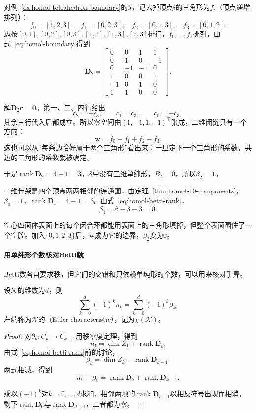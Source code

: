 \begin{example}[四面体表面的同调]
\label{ex:homol-tetrahedron-homology}
对例~\ref{ex:homol-tetrahedron-boundary}的$\mathcal S$，记去掉顶点$i$的三角形为$f_i$（顶点递增排列）：
\[
 f_0=[1,2,3],\quad f_1=[0,2,3],\quad f_2=[0,1,3],\quad f_3=[0,1,2].
\]
边按$[0,1],[0,2],[0,3],[1,2],[1,3],[2,3]$排行，$f_0,\ldots,f_3$排列，由式~\eqref{eq:homol-boundary}得到
\[
 \bm D_2=\begin{bmatrix}
 0&0&1&1\\
 0&1&0&-1\\
 0&-1&-1&0\\
 1&0&0&1\\
 -1&0&1&0\\
 1&1&0&0
 \end{bmatrix}.
\]

解$\bm D_2\bm c=\bm 0$。第一、二、四行给出
\[
 c_2=-c_3,\qquad c_1=c_3,\qquad c_0=-c_3,
\]
其余三行代入后都成立。所以零空间由$(1,-1,1,-1)^\top$张成，二维闭链只有一个方向：
\[
 \bm w=f_0-f_1+f_2-f_3.
\]
这也可以从“每条边恰好属于两个三角形”看出来：一旦定下一个三角形的系数，共边的三角形的系数就被确定。

于是$\operatorname{rank}\bm D_2=4-1=3$。$\mathcal S$中没有三维单纯形，$B_2=0$，所以$\beta_2=1$。

一维骨架是四个顶点两两相邻的连通图，由定理~\ref{thm:homol-h0-components}，$\beta_0=1$，$\operatorname{rank}\bm D_1=4-1=3$。由式~\eqref{eq:homol-betti-rank}，
\[
 \beta_1=6-3-3=0.
\]

空心四面体表面上的每个闭合环都能用表面上的三角形填掉，但整个表面围住了一个空腔。加入$\{0,1,2,3\}$后，$\bm w$成为它的边界，$\beta_2$变为$0$。
\end{example}

\paragraph{用单纯形个数核对Betti数}
Betti数各自要求秩，但它们的交错和只依赖单纯形的个数，可以用来核对手算。

\begin{theorem}[Euler示性数]
\label{thm:homol-euler-characteristic}
设$\mathcal K$的维数为$d$，则
\begin{equation}
 \sum_{k=0}^d(-1)^kn_k=\sum_{k=0}^d(-1)^k\beta_k.
 \label{eq:homol-euler}
\end{equation}
左端称为$\mathcal K$的（Euler characteristic），记为$\chi(\mathcal K)$。
\end{theorem}

\begin{proof}
对$\partial_k:C_k\to C_{k-1}$用秩零度定理，得到
\[
 n_k=\dim Z_k+\operatorname{rank}\bm D_k.
\]
由式~\eqref{eq:homol-betti-rank}前的讨论，
\[
 \beta_k=\dim Z_k-\operatorname{rank}\bm D_{k+1}.
\]
两式相减，得到
\[
 n_k-\beta_k=\operatorname{rank}\bm D_k+\operatorname{rank}\bm D_{k+1}.
\]

乘以$(-1)^k$对$k=0,\ldots,d$求和，相邻两项的$\operatorname{rank}\bm D_{k+1}$以相反符号出现而相消，剩下$\operatorname{rank}\bm D_0$与$\operatorname{rank}\bm D_{d+1}$，二者都为零。
\end{proof}


